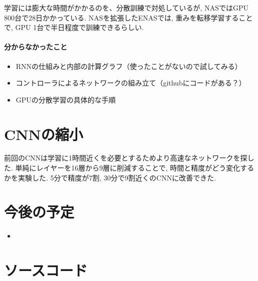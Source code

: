 \documentclass[twocolumn]{jarticle}     %
\begin{document}
学習には膨大な時間がかかるのを、分散訓練で対処しているが, NASではGPU 800台で28日かかっている.
NASを拡張したENASでは, 重みを転移学習することで, GPU 1台で半日程度で訓練できるらしい.

\paragraph{分からなかったこと}
\begin{itemize}
  \item RNNの仕組みと内部の計算グラフ（使ったことがないので試してみる）
  \item コントローラによるネットワークの組み立て（githubにコードがある？）
  \item GPUの分散学習の具体的な手順
\end{itemize}

\section{CNNの縮小}
前回のCNNは学習に1時間近くを必要とするためより高速なネットワークを探した.
単純にレイヤーを16層から9層に削減することで, 時間と精度がどう変化するかを実験した.
5分で精度が7割, 30分で9割近くのCNNに改善できた.

\section{今後の予定}
\begin{itemize}
	\item {}
\end{itemize}


\section{ソースコード}





\end{document}
